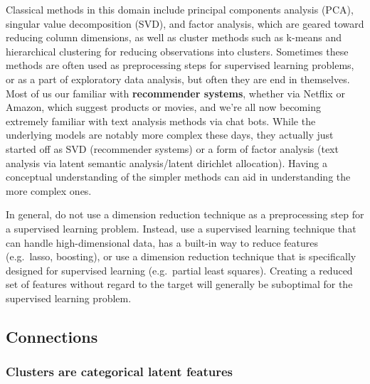 \documentclass[
  letterpaper,
]{krantz}
\begin{document}
Classical methods in this domain include principal components analysis
(PCA), singular value decomposition (SVD), and factor analysis, which
are geared toward reducing column dimensions, as well as cluster methods
such as k-means and hierarchical clustering for reducing observations
into clusters. Sometimes these methods are often used as preprocessing
steps for supervised learning problems, or as a part of exploratory data
analysis, but often they are end in themselves. Most of us our familiar
with \textbf{recommender systems}, whether via Netflix or Amazon, which
suggest products or movies, and we're all now becoming extremely
familiar with text analysis methods via chat bots. While the underlying
models are notably more complex these days, they actually just started
off as SVD (recommender systems) or a form of factor analysis (text
analysis via latent semantic analysis/latent dirichlet allocation).
Having a conceptual understanding of the simpler methods can aid in
understanding the more complex ones.

\begin{tcolorbox}[enhanced jigsaw, colback=white, toprule=.15mm, colframe=quarto-callout-tip-color-frame, breakable, leftrule=.75mm, bottomrule=.15mm, opacityback=0, left=2mm, rightrule=.15mm, arc=.35mm]
\begin{minipage}[t]{5.5mm}
\textcolor{quarto-callout-tip-color}{\faLightbulb}
\end{minipage}%
\begin{minipage}[t]{\textwidth - 5.5mm}

In general, do not use a dimension reduction technique as a
preprocessing step for a supervised learning problem. Instead, use a
supervised learning technique that can handle high-dimensional data, has
a built-in way to reduce features (e.g.~lasso, boosting), or use a
dimension reduction technique that is specifically designed for
supervised learning (e.g.~partial least squares). Creating a reduced set
of features without regard to the target will generally be suboptimal
for the supervised learning problem.

\end{minipage}%
\end{tcolorbox}

\subsection{Connections}\label{connections}

\subsubsection{Clusters are categorical latent
features}\label{clusters-are-categorical-latent-features}
\end{document}
